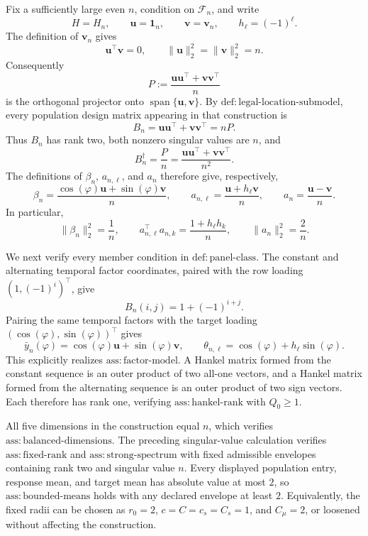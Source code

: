 Fix a sufficiently large even \(n\), condition on \(\mathcal F_n\), and write
\[
 H=H_n,\qquad \boldsymbol u=\boldsymbol 1_n,\qquad
 \boldsymbol v=\boldsymbol v_n,\qquad h_\ell=(-1)^\ell .
\]
The definition of \(\boldsymbol v_n\) gives
\[
 \boldsymbol u^{\top}\boldsymbol v=0,
 \qquad \|\boldsymbol u\|_2^2=\|\boldsymbol v\|_2^2=n.
\]
Consequently
\[
 P:=\frac{\boldsymbol u\boldsymbol u^{\top}
              +\boldsymbol v\boldsymbol v^{\top}}{n}
\]
is the orthogonal projector onto
\(\operatorname{span}\{\boldsymbol u,\boldsymbol v\}\).  By
\(\mathrm{def{:}legal\mbox{-}location\mbox{-}submodel}\), every population
design matrix appearing in that construction is
\[
 B_n=\boldsymbol u\boldsymbol u^{\top}
       +\boldsymbol v\boldsymbol v^{\top}=nP.
\]
Thus \(B_n\) has rank two, both nonzero singular values are \(n\), and
\[
 B_n^\dagger=\frac{P}{n}
 =\frac{\boldsymbol u\boldsymbol u^{\top}
          +\boldsymbol v\boldsymbol v^{\top}}{n^2}.
\]
The definitions of \(\beta_n\), \(a_{n,\ell}\), and \(a_n\) therefore give,
respectively,
\[
 \beta_n=\frac{\cos(\varphi)\boldsymbol u
                     +\sin(\varphi)\boldsymbol v}{n},
 \qquad
 a_{n,\ell}=\frac{\boldsymbol u+h_\ell\boldsymbol v}{n},
 \qquad
 a_n=\frac{\boldsymbol u-\boldsymbol v}{n}.
\]
In particular,
\[
 \|\beta_n\|_2^2=\frac1n,
 \qquad
 a_{n,\ell}^{\top}a_{n,k}=\frac{1+h_\ell h_k}{n},
 \qquad
 \|a_n\|_2^2=\frac2n.                                      \tag{1}
\]

We next verify every member condition in
\(\mathrm{def{:}panel\mbox{-}class}\).  The constant and alternating temporal
factor coordinates, paired with the row loading \((1,(-1)^i)^{\top}\), give
\[
 B_n(i,j)=1+(-1)^{i+j}.
\]
Pairing the same temporal factors with the target loading
\((\cos(\varphi),\sin(\varphi))^{\top}\) gives
\[
 \bar y_n(\varphi)=\cos(\varphi)\boldsymbol u
                    +\sin(\varphi)\boldsymbol v,
 \qquad
 \theta_{n,\ell}=\cos(\varphi)+h_\ell\sin(\varphi).          \tag{2}
\]
This explicitly realizes \(\mathrm{ass{:}factor\mbox{-}model}\).  A Hankel
matrix formed from the constant sequence is an outer product of two all-one
vectors, and a Hankel matrix formed from the alternating sequence is an outer
product of two sign vectors.  Each therefore has rank one, verifying
\(\mathrm{ass{:}hankel\mbox{-}rank}\) with \(Q_0\geq1\).

All five dimensions in the construction equal \(n\), which verifies
\(\mathrm{ass{:}balanced\mbox{-}dimensions}\).  The preceding singular-value
calculation verifies \(\mathrm{ass{:}fixed\mbox{-}rank}\) and
\(\mathrm{ass{:}strong\mbox{-}spectrum}\) with fixed admissible envelopes
containing rank two and singular value \(n\).  Every displayed population
entry, response mean, and target mean has absolute value at most \(2\), so
\(\mathrm{ass{:}bounded\mbox{-}means}\) holds with any declared envelope at
least \(2\).  Equivalently, the fixed radii can be chosen as
\(r_0=2\), \(c=C=c_s=C_s=1\), and \(C_\mu=2\), or loosened without affecting
the construction.


